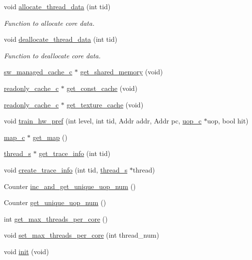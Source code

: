 \begin{DoxyCompactItemize}
void \hyperlink{classcore__c_aec46a84776dd9183d5fd2d030e20b130}{allocate\_\-thread\_\-data} (int tid)
\begin{DoxyCompactList}\small\item\em Function to allocate core data. \item\end{DoxyCompactList}\item 
void \hyperlink{classcore__c_a85bf5186741e79a08aeb4482b1ca6a87}{deallocate\_\-thread\_\-data} (int tid)
\begin{DoxyCompactList}\small\item\em Function to deallocate core data. \item\end{DoxyCompactList}\item 
\hyperlink{classsw__managed__cache__c}{sw\_\-managed\_\-cache\_\-c} $\ast$ \hyperlink{classcore__c_a2c1047fae4620dcc4edf5e303f98e778}{get\_\-shared\_\-memory} (void)
\item 
\hyperlink{classreadonly__cache__c}{readonly\_\-cache\_\-c} $\ast$ \hyperlink{classcore__c_a0a24b5c2be04c4b825a8821568cfaa24}{get\_\-const\_\-cache} (void)
\item 
\hyperlink{classreadonly__cache__c}{readonly\_\-cache\_\-c} $\ast$ \hyperlink{classcore__c_a028157bb54df64d58fd7386be45f6841}{get\_\-texture\_\-cache} (void)
\item 
void \hyperlink{classcore__c_aec634f61fbc273341b5c3cfc99f6f7e5}{train\_\-hw\_\-pref} (int level, int tid, Addr addr, Addr pc, \hyperlink{classuop__c}{uop\_\-c} $\ast$uop, bool hit)
\item 
\hyperlink{classmap__c}{map\_\-c} $\ast$ \hyperlink{classcore__c_aeba9eee42890665d30e9719fa08a61e0}{get\_\-map} ()
\item 
\hyperlink{structthread__s}{thread\_\-s} $\ast$ \hyperlink{classcore__c_ac704b051e53499bc4bad5002835572b8}{get\_\-trace\_\-info} (int tid)
\item 
void \hyperlink{classcore__c_ad0199243dbb4a41e4b94779820e2c604}{create\_\-trace\_\-info} (int tid, \hyperlink{structthread__s}{thread\_\-s} $\ast$thread)
\item 
Counter \hyperlink{classcore__c_aa13340ba8f962f5a4d477c463587648b}{inc\_\-and\_\-get\_\-unique\_\-uop\_\-num} ()
\item 
Counter \hyperlink{classcore__c_a31295f019b1919862648351ba01970ec}{get\_\-unique\_\-uop\_\-num} ()
\item 
int \hyperlink{classcore__c_acfdb9cf1141091480df728f56d5d5998}{get\_\-max\_\-threads\_\-per\_\-core} ()
\item 
void \hyperlink{classcore__c_a8b4f4ffa31f9e0dbe843845892558f87}{set\_\-max\_\-threads\_\-per\_\-core} (int thread\_\-num)
\item 
void \hyperlink{classcore__c_ac8a341d8d0cdc07376c9a58fc9a00706}{init} (void)
\end{DoxyCompactItemize}
